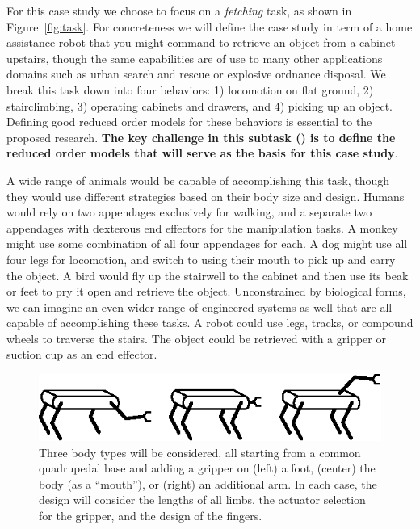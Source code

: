 \documentclass[11pt]{article}
\begin{document}
For this case study we choose to focus on a \emph{fetching} task, as shown in Figure~\ref{fig:task}. For concreteness we will define the case study in term of a home assistance robot that you might command to retrieve an object from a cabinet upstairs, though the same capabilities are of use to many other applications domains such as urban search and rescue or explosive ordnance disposal.
We break this task down into four behaviors: 1) locomotion on flat ground, 2) stairclimbing, 3) operating cabinets and drawers, and 4) picking up an object. Defining good reduced order models for these behaviors is essential to the proposed research. 
{\bf The key challenge in this subtask () is to define the reduced order models that will serve as the basis for this case study}.

A wide range of animals would be capable of accomplishing this task, though they would use different strategies based on their body size and design. Humans would rely on two appendages exclusively for walking, and a separate two appendages with dexterous end effectors for the manipulation tasks. A monkey might use some combination of all four appendages for each. A dog might use all four legs for locomotion, and switch to using their mouth to pick up and carry the object. A bird would fly up the stairwell to the cabinet and then use its beak or feet to pry it open and retrieve the object. Unconstrained by biological forms, we can imagine an even wider range of engineered systems as well that are all capable of accomplishing these tasks. A robot could use legs, tracks, or compound wheels to traverse the stairs. The object could be retrieved with a gripper or suction cup as an end effector. 

\begin{figure}[b]
    \vspace{.5em}
    \centering
    \includegraphics[width=0.9\columnwidth]{bodies.eps}
    \vspace{.5em}
\caption{Three body types will be considered, all starting from a common quadrupedal base and adding a gripper on (left) a foot, (center) the body (as a ``mouth''), or (right) an additional arm. In each case, the design will consider the lengths of all limbs, the actuator selection for the gripper, and the design of the fingers. }
    \label{fig:bodies}
\end{figure}
\end{document}
